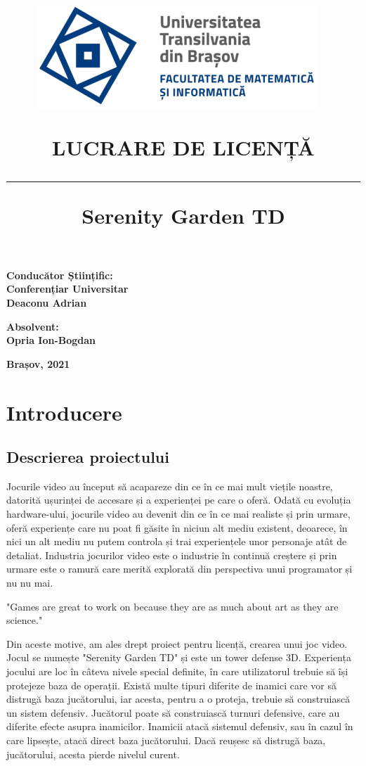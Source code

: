 \documentclass[12pt, a4paper]{article}
\title{%
	\includegraphics[height=0.3\textwidth]{UNITBV2.png}~ 
	\\[1cm]
	\vspace{20mm}
	
	\bf 	LUCRARE DE LICENȚĂ
	\noindent\rule{14cm}{1pt}
	\bf Serenity Garden TD
}
\date{}
\begin{document}
	
	
	
	\maketitle
	\vspace{10mm} %
	\begin{flushleft}
		\bf 	Conducător Științific:
		\bf     \\Conferențiar Universitar 
		\bf     \\Deaconu Adrian
	\end{flushleft}
	
	\begin{flushright}
		\bf Absolvent:
		\bf \\Opria Ion-Bogdan
	\end{flushright}
	
	\vspace{4mm} %
	
	\begin{center}
		\bf Brașov, 2021 
	\end{center}
	
	
	\tableofcontents
	\pagebreak
	
	\section{Introducere}
	
	\subsection{Descrierea proiectului}
	
	Jocurile video au început să acapareze din ce în ce mai mult viețile noastre, datorită ușurinței de accesare și a experienței pe care o oferă. Odată cu evoluția hardware-ului, jocurile video au devenit din ce în ce mai realiste și prin urmare, oferă experiențe care nu poat fi găsite în niciun alt mediu existent, deoarece, în nici un alt mediu nu putem controla și trai experiențele unor personaje atât de detaliat. Industria jocurilor video este o industrie în continuă creștere și prin urmare este o ramură care merită explorată din perspectiva unui programator și nu nu mai. 
	\newline
	
	"Games are great to work on because they are as much about art as they are science." \cite{gameProgrammingComplete}
	\newline
	
	Din aceste motive, am ales drept proiect pentru licență, crearea unui joc video. Jocul se numește "Serenity Garden TD" și este un tower defense 3D. Experiența jocului are loc în câteva nivele special definite, în care utilizatorul trebuie să își protejeze baza de operații. Există multe tipuri diferite de inamici care vor să distrugă baza jucătorului, iar acesta, pentru a o proteja, trebuie să construiască un sistem defensiv. Jucătorul poate să construiască turnuri defensive, care au diferite efecte asupra inamicilor. Inamicii atacă sistemul defensiv, sau în cazul în care lipsește, atacă direct baza jucătorului. Dacă reușesc să distrugă baza, jucătorului, acesta pierde nivelul curent.
	\newline
	
\end{document}
